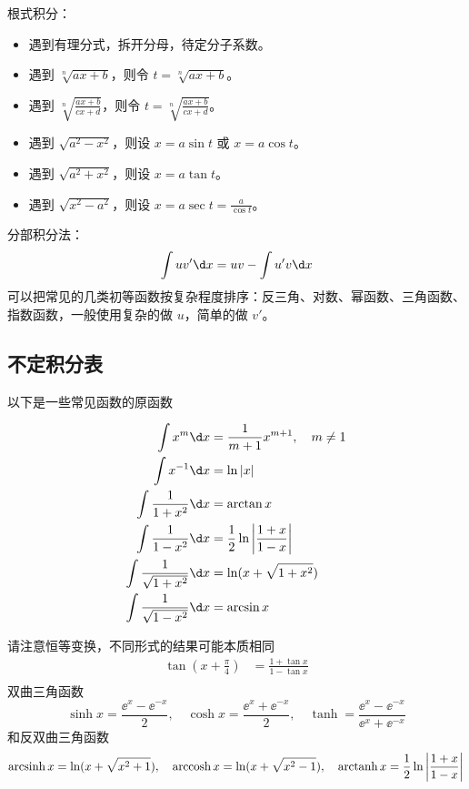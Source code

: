 根式积分：

\begin{itemize}
	\item 遇到有理分式，拆开分母，待定分子系数。
	\item 遇到 $\sqrt[n]{ax+b}$，则令 $t = \sqrt[n]{ax+b}$。
	\item 遇到 $\sqrt[n]{\frac{ax+b}{cx+d}}$，则令 $t = \sqrt[n]{\frac{ax+b}{cx+d}}$。
	\item 遇到 $\sqrt{a^2 - x^2}$，则设 $x = a\sin t$ 或 $x = a\cos t$。
	\item 遇到 $\sqrt{a^2 + x^2}$，则设 $x = a \tan t$。
	\item 遇到 $\sqrt{x^2 - a^2}$，则设 $x = a \sec t = \frac{a}{\cos t}$。
\end{itemize}

分部积分法：
\[ \int u v' \d x = u v - \int u' v \d x \]
可以把常见的几类初等函数按复杂程度排序：反三角、对数、幂函数、三角函数、指数函数，一般使用复杂的做 $u$，简单的做 $v'$。

\subsection{不定积分表}

以下是一些常见函数的原函数

\[ \begin{aligned}
		\int {x}^{m} \d x                  & = \frac{1}{m + 1} x^{m+1}, \quad m \neq 1        \\
		\int x^{-1} \d x                   & = \ln |x|                                        \\
		\int \frac{1}{1 + x^2} \d x        & = \arctan x                                      \\
		\int \frac{1}{1 - x^2} \d x        & = \frac{1}{2} \ln \left| \frac{1+x}{1-x} \right| \\
		\int \frac{1}{\sqrt{1 + x^2}} \d x & = \ln(x+\sqrt{1 + x^2})                          \\
		\int \frac{1}{\sqrt{1 - x^2}} \d x & = \arcsin x                                      \\
	\end{aligned} \]

请注意恒等变换，不同形式的结果可能本质相同
\[ \begin{aligned}
		\tan \left(x + \frac{\pi}{4}\right) & = \frac{1 + \tan x}{1 - \tan x} \\
	\end{aligned} \]
双曲三角函数
\[ \sinh x = \frac{\ee^x - \ee^{-x}}{2}, \quad \cosh x = \frac{\ee^x + \ee^{-x}}{2}, \quad \tanh = \frac{\ee^x - \ee^{-x}}{\ee^x + \ee^{-x}} \]
和反双曲三角函数
\[ \operatorname{arcsinh} x = \ln(x+\sqrt{x^2+1}), \quad \operatorname{arccosh} x = \ln(x+\sqrt{x^2-1}), \quad \operatorname{arctanh} x = \frac{1}{2} \ln \left| \frac{1+x}{1-x}\right| \]

